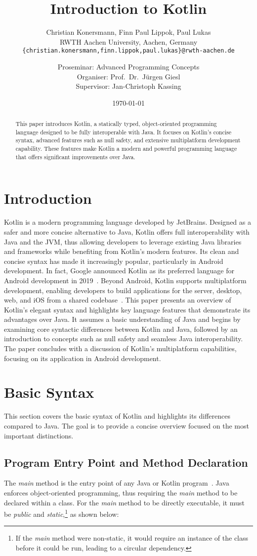 \documentclass[a4paper,11pt]{article}
\title{\vspace{-0cm}\huge \bfseries Introduction to Kotlin}
\author{
  Christian Konersmann, Finn Paul Lippok, Paul Lukas\\[1ex]
  RWTH Aachen University, Aachen, Germany\\
  \texttt{\{christian.konersmann,finn.lippok,paul.lukas\}@rwth-aachen.de}\\
  \and
  Proseminar: Advanced Programming Concepts\\
  Organiser: Prof.\ Dr.\ Jürgen Giesl\\
  Supervisor: Jan-Christoph Kassing
}
\date{\today}
\begin{document}
\maketitle

\begin{abstract}
This paper introduces Kotlin, a statically typed, object-oriented programming language designed to be fully interoperable with Java. It focuses on Kotlin's concise syntax, advanced features such as null safety, and extensive multiplatform development capability. These features make Kotlin a modern and powerful programming language that offers significant improvements over Java.
\end{abstract}

\section{Introduction}
Kotlin is a modern programming language developed by JetBrains. Designed as a safer and more concise alternative to Java, Kotlin offers full interoperability with Java and the JVM, thus allowing developers to leverage existing Java libraries and frameworks while benefiting from Kotlin's modern features. Its clean and concise syntax has made it increasingly popular, particularly in Android development. In fact, Google announced Kotlin as its preferred language for Android development in 2019~\cite{intro-google}. Beyond Android, Kotlin supports multiplatform development, enabling developers to build applications for the server, desktop, web, and iOS from a shared codebase~\cite{intro-multiplatform-dev}. 
This paper presents an overview of Kotlin's elegant syntax and highlights key language features that demonstrate its advantages over Java. It assumes a basic understanding of Java and begins by examining core syntactic differences between Kotlin and Java, followed by an introduction to concepts such as null safety and seamless Java interoperability. The paper concludes with a discussion of Kotlin's multiplatform capabilities, focusing on its application in Android development.

\section{Basic Syntax}
This section covers the basic syntax of Kotlin and highlights its differences compared to Java. The goal is to provide a concise overview focused on the most important distinctions.

\subsection{Program Entry Point and Method Declaration}\label{sec:program-entry-point}
The \textit{main} method is the entry point of any Java or Kotlin program~\cite{program-entry-point}. Java enforces object-oriented programming, thus requiring the \textit{main} method to be declared within a class. For the \textit{main} method to be directly executable, it must be \textit{public} and \textit{static},\footnote{If the \textit{main} method were non-static, it would require an instance of the class before it could be run, leading to a circular dependency.} as shown below:
\end{document}
